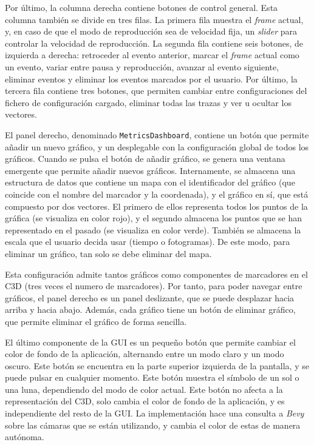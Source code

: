 Por último, la columna derecha contiene botones de control general. Esta columna también se divide en tres filas. La primera fila muestra el \textit{frame} actual, y, en caso de que el modo de reproducción sea de velocidad fija, un \textit{slider} para controlar la velocidad de reproducción. La segunda fila contiene seis botones, de izquierda a derecha: retroceder al evento anterior, marcar el \textit{frame} actual como un evento, variar entre pausa y reproducción, avanzar al evento siguiente, eliminar eventos y eliminar los eventos marcados por el usuario. Por último, la tercera fila contiene tres botones, que permiten cambiar entre configuraciones del fichero de configuración cargado, eliminar todas las trazas y ver u ocultar los vectores.

El panel derecho, denominado \texttt{MetricsDashboard}, contiene un botón que permite añadir un nuevo gráfico, y un desplegable con la configuración global de todos los gráficos. Cuando se pulsa el botón de añadir gráfico, se genera una ventana emergente que permite añadir nuevos gráficos. Internamente, se almacena una estructura de datos que contiene un mapa con el identificador del gráfico (que coincide con el nombre del marcador y la coordenada), y el gráfico en sí, que está compuesto por dos vectores. El primero de ellos representa todos los puntos de la gráfica (se visualiza en color rojo), y el segundo almacena los puntos que se han representado en el pasado (se visualiza en color verde). También se almacena la escala que el usuario decida usar (tiempo o fotogramas). De este modo, para eliminar un gráfico, tan solo se debe eliminar del mapa.

Esta configuración admite tantos gráficos como componentes de marcadores en el \ac{C3D} (tres veces el numero de marcadores). Por tanto, para poder navegar entre gráficos, el panel derecho es un panel deslizante, que se puede desplazar hacia arriba y hacia abajo. Además, cada gráfico tiene un botón de eliminar gráfico, que permite eliminar el gráfico de forma sencilla.

El último componente de la \ac{GUI} es un pequeño botón que permite cambiar el color de fondo de la aplicación, alternando entre un modo claro y un modo oscuro. Este botón se encuentra en la parte superior izquierda de la pantalla, y se puede pulsar en cualquier momento. Este botón muestra el símbolo de un sol o una luna, dependiendo del modo de color actual. Este botón no afecta a la representación del \ac{C3D}, solo cambia el color de fondo de la aplicación, y es independiente del resto de la \ac{GUI}. La implementación hace una consulta a \textit{Bevy} sobre las cámaras que se están utilizando, y cambia el color de estas de manera autónoma. 
